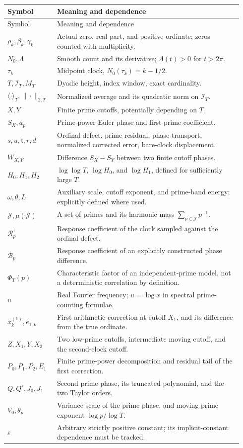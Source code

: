 \documentclass[11pt,reqno]{amsart}
\numberwithin{equation}{section}
\newcommand{\calI}{\mathcal I_T}
\newcommand{\lamb}{\Lambda}
\newcommand{\eps}{\varepsilon}
\begin{document}
\begin{longtable}{p{0.19\linewidth}p{0.75\linewidth}}
\toprule Symbol & Meaning and dependence\\\midrule\endfirsthead
\toprule Symbol & Meaning and dependence\\\midrule\endhead
$\rho_k,\beta_k,\gamma_k$ & Actual zero, real part, and positive ordinate; zeros counted with multiplicity.\\
$N_0,\lamb$ & Smooth count and its derivative; $\lamb(t)>0$ for $t>2\pi$.\\
$\tau_k$ & Midpoint clock, $N_0(\tau_k)=k-1/2$.\\
$T,\calI,M_T$ & Dyadic height, index window, exact cardinality.\\
$\langle\cdot\rangle_T,\|\cdot\|_{2,T}$ & Normalized average and its quadratic norm on $\calI$.\\
$X,Y$ & Finite prime cutoffs, potentially depending on $T$.\\
$S_X,a_p$ & Prime-power Euler phase and first-prime coefficient.\\
$s,u,\mathfrak t,r,d$ & Ordinal defect, prime residual, phase transport, normalized corrected error, bare-clock displacement.\\
$W_{X,Y}$ & Difference $S_X-S_Y$ between two finite cutoff phases.\\
$H_0,H_1,H_2$ & $\log\log T$, $\log H_0$, and $\log H_1$, defined for sufficiently large $T$.\\
$\omega,\theta,L$ & Auxiliary scale, cutoff exponent, and prime-band energy; explicitly defined where used.\\
$\mathcal J,\mu(\mathcal J)$ & A set of primes and its harmonic mass $\sum_{p\in\mathcal J}p^{-1}$.\\
$\mathcal R_p^\tau$ & Response coefficient of the clock sampled against the ordinal defect.\\
$\mathcal B_p$ & Response coefficient of an explicitly constructed phase difference.\\
$\Phi_T(p)$ & Characteristic factor of an independent-prime model, not a deterministic correlation by definition.\\
$u$ & Real Fourier frequency; $u=\log x$ in spectral prime-counting formulae.\\
$x_k^{(1)},e_{1,k}$ & First arithmetic correction at cutoff $X_1$, and its difference from the true ordinate.\\
$Z,X_1,Y,X_2$ & Two low-prime cutoffs, intermediate moving cutoff, and the second-clock cutoff.\\
$P_0,P_1,P_2,E_1$ & Finite prime-power decomposition and residual tail of the first correction.\\
$Q,Q^\flat,J_0,J_1$ & Second prime phase, its truncated polynomial, and the two Taylor orders.\\
$V_0,\theta_p$ & Variance scale of the prime phase, and moving-prime exponent $\log p/\log T$.\\
$\eps$ & Arbitrary strictly positive constant; its implicit-constant dependence must be tracked.\\
\bottomrule
\end{longtable}
\end{document}
